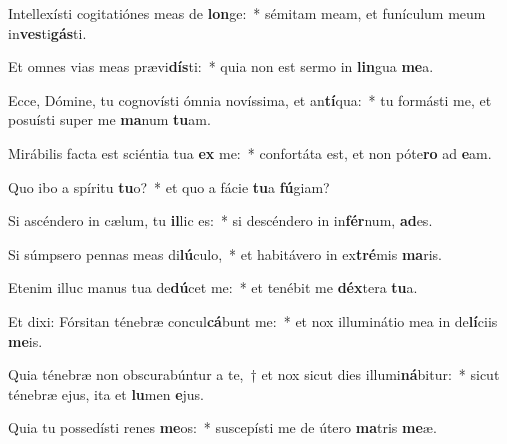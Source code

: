 \item Intellexísti cogitatiónes meas de \textbf{lon}ge:~* sémitam meam, et funículum meum in\textbf{ves}ti\textbf{gás}ti.
\item Et omnes vias meas prævi\textbf{dís}ti:~* quia non est sermo in \textbf{lin}gua \textbf{me}a.
\item Ecce, Dómine, tu cognovísti ómnia novíssima, et an\textbf{tí}qua:~* tu formásti me, et posuísti super me \textbf{ma}num \textbf{tu}am.
\item Mirábilis facta est sciéntia tua \textbf{ex} me:~* confortáta est, et non póte\textbf{ro} ad \textbf{e}am.
\item Quo ibo a spíritu \textbf{tu}o?~* et quo a fácie \textbf{tu}a \textbf{fú}giam?
\item Si ascéndero in cælum, tu \textbf{il}lic es:~* si descéndero in in\textbf{fér}num, \textbf{ad}es.
\item Si súmpsero pennas meas di\textbf{lú}culo,~* et habitávero in ex\textbf{tré}mis \textbf{ma}ris.
\item Etenim illuc manus tua de\textbf{dú}cet me:~* et tenébit me \textbf{déx}tera \textbf{tu}a.
\item Et dixi: Fórsitan ténebræ concul\textbf{cá}bunt me:~* et nox illuminátio mea in de\textbf{lí}ciis \textbf{me}is.
\item Quia ténebræ non obscurabúntur a te,~† et nox sicut dies illumi\textbf{ná}bitur:~* sicut ténebræ ejus, ita et \textbf{lu}men \textbf{e}jus.
\item Quia tu possedísti renes \textbf{me}os:~* suscepísti me de útero \textbf{ma}tris \textbf{me}æ.

